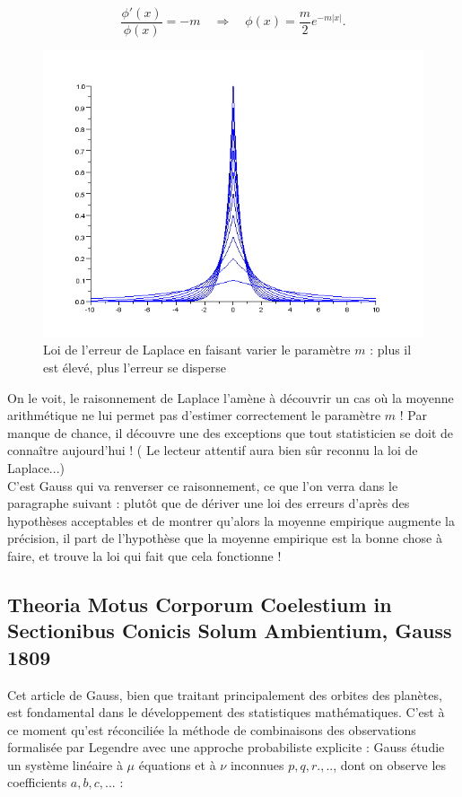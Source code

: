 \documentclass{article}
\begin{document}
\[\frac{\phi'(x)}{\phi(x)}=-m\quad \Rightarrow\quad \phi(x)=\frac{m}{2} e^{-m|x|}.\]

\begin{figure}[!h]\centering
\includegraphics[scale=0.4]{Laplace.png}
\caption{Loi de l'erreur de Laplace en faisant varier le paramètre $m$ : plus il est élevé, plus l'erreur se disperse}
\label{fig:Laplace}
\end{figure}
  
On le voit, le raisonnement de Laplace l'amène à découvrir un cas où la moyenne arithmétique ne lui permet pas d'estimer correctement le paramètre $m$ ! Par manque de chance, il découvre une des exceptions que tout statisticien se doit de connaître aujourd'hui ! ( Le lecteur attentif aura bien sûr reconnu la loi de Laplace...)\\

C'est Gauss qui va renverser ce raisonnement, ce que l'on verra dans le paragraphe suivant : plutôt que de dériver une loi des erreurs d'après des hypothèses acceptables et de montrer qu'alors la moyenne empirique augmente la précision, il part de l'hypothèse que la moyenne empirique est la bonne chose à faire, et trouve la loi qui fait que cela fonctionne !

\subsection{Theoria Motus Corporum Coelestium in Sectionibus Conicis Solum Ambientium, Gauss 1809}

Cet article de Gauss, bien que traitant principalement des orbites des planètes, est fondamental dans le développement des statistiques mathématiques. C'est à ce moment qu'est réconciliée la méthode de combinaisons des observations formalisée par Legendre avec une approche probabiliste explicite : Gauss étudie un système linéaire à $\mu$ équations et à $\nu$ inconnues $p,q,r.,..$, dont on observe les coefficients $a,b,c,...$ :
\end{document}
